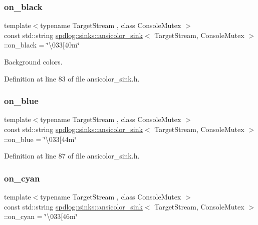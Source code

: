 \subsubsection{\texorpdfstring{on\+\_\+black}{on\_black}}
{\footnotesize\ttfamily template$<$typename Target\+Stream , class Console\+Mutex $>$ \\
const std\+::string \hyperlink{classspdlog_1_1sinks_1_1ansicolor__sink}{spdlog\+::sinks\+::ansicolor\+\_\+sink}$<$ Target\+Stream, Console\+Mutex $>$\+::on\+\_\+black = \char`\"{}\textbackslash{}033\mbox{[}40m\char`\"{}}



Background colors. 



Definition at line 83 of file ansicolor\+\_\+sink.\+h.

\mbox{\label{classspdlog_1_1sinks_1_1ansicolor__sink_a8b4b2900e0db2ed81b1d87531c75db70}} 
\subsubsection{\texorpdfstring{on\+\_\+blue}{on\_blue}}
{\footnotesize\ttfamily template$<$typename Target\+Stream , class Console\+Mutex $>$ \\
const std\+::string \hyperlink{classspdlog_1_1sinks_1_1ansicolor__sink}{spdlog\+::sinks\+::ansicolor\+\_\+sink}$<$ Target\+Stream, Console\+Mutex $>$\+::on\+\_\+blue = \char`\"{}\textbackslash{}033\mbox{[}44m\char`\"{}}



Definition at line 87 of file ansicolor\+\_\+sink.\+h.

\mbox{\label{classspdlog_1_1sinks_1_1ansicolor__sink_a628bbe153b16a66b33566608794b82fc}} 
\subsubsection{\texorpdfstring{on\+\_\+cyan}{on\_cyan}}
{\footnotesize\ttfamily template$<$typename Target\+Stream , class Console\+Mutex $>$ \\
const std\+::string \hyperlink{classspdlog_1_1sinks_1_1ansicolor__sink}{spdlog\+::sinks\+::ansicolor\+\_\+sink}$<$ Target\+Stream, Console\+Mutex $>$\+::on\+\_\+cyan = \char`\"{}\textbackslash{}033\mbox{[}46m\char`\"{}}



